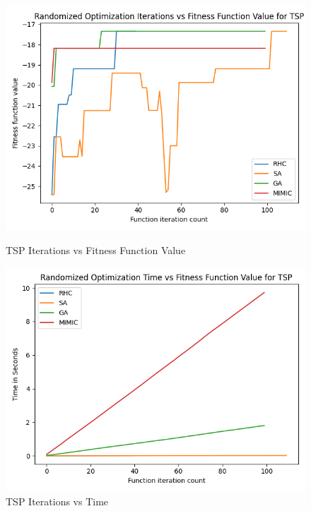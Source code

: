 \documentclass[11pt]{article}
\begin{document}
    \begin{figure}
        \begin{minipage}{0.4\textwidth}
            \centering
            \includegraphics[width=0.9\linewidth]{tsp1.png}
            \caption{TSP Iterations vs Fitness Function Value}\label{Fig:TSP Iterations vs Fitness Function Value}
        \end{minipage}\hfill
        \begin{minipage}{0.4\textwidth}
            \centering
            \includegraphics[width=0.9\linewidth]{tsp2.png}
            \caption{TSP Iterations vs Time}\label{Fig:TSP Iterations vs Time}
        \end{minipage}
    \end{figure}
\end{document}
